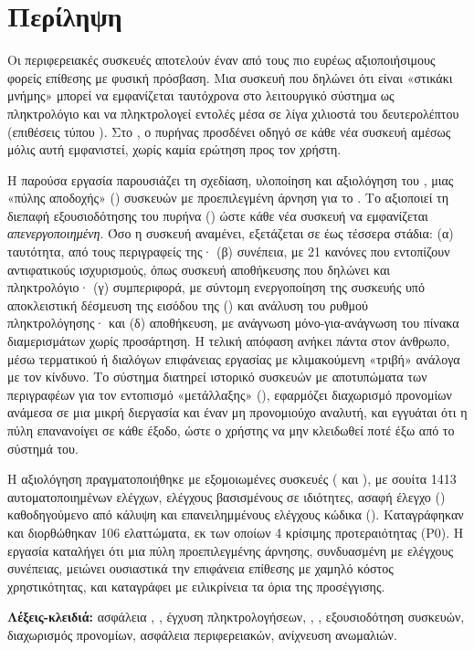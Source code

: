 \chapter*{Περίληψη}
\thispagestyle{plain}

Οι περιφερειακές συσκευές  αποτελούν έναν από τους πιο ευρέως
αξιοποιήσιμους φορείς επίθεσης με φυσική πρόσβαση. Μια συσκευή που δηλώνει ότι
είναι «στικάκι μνήμης» μπορεί να εμφανίζεται ταυτόχρονα στο λειτουργικό σύστημα ως
πληκτρολόγιο και να πληκτρολογεί εντολές μέσα σε λίγα χιλιοστά του δευτερολέπτου
(επιθέσεις τύπου ). Στο , ο πυρήνας προσδένει οδηγό σε κάθε
νέα συσκευή αμέσως μόλις αυτή εμφανιστεί, χωρίς καμία ερώτηση προς τον χρήστη.

Η παρούσα εργασία παρουσιάζει τη σχεδίαση, υλοποίηση και αξιολόγηση του
\Probolos, μιας «πύλης αποδοχής» () συσκευών  με
προεπιλεγμένη άρνηση για το . Το \Probolos{} αξιοποιεί τη διεπαφή
εξουσιοδότησης του πυρήνα () ώστε κάθε νέα συσκευή να
εμφανίζεται \emph{απενεργοποιημένη}. Όσο η συσκευή αναμένει, εξετάζεται σε έως
τέσσερα στάδια: (α) ταυτότητα, από τους περιγραφείς της· (β) συνέπεια, με
21 κανόνες που εντοπίζουν αντιφατικούς ισχυρισμούς, όπως συσκευή αποθήκευσης που
δηλώνει και πληκτρολόγιο· (γ) συμπεριφορά, με σύντομη ενεργοποίηση της συσκευής
υπό αποκλειστική δέσμευση της εισόδου της () και ανάλυση του ρυθμού
πληκτρολόγησης· και (δ) αποθήκευση, με ανάγνωση μόνο-για-ανάγνωση του πίνακα
διαμερισμάτων χωρίς προσάρτηση. Η τελική απόφαση ανήκει πάντα στον άνθρωπο, μέσω
τερματικού ή διαλόγων επιφάνειας εργασίας με κλιμακούμενη «τριβή» ανάλογα με τον
κίνδυνο. Το σύστημα διατηρεί ιστορικό συσκευών με αποτυπώματα των περιγραφέων
για τον εντοπισμό «μετάλλαξης» (), εφαρμόζει διαχωρισμό
προνομίων ανάμεσα σε μια μικρή διεργασία  και έναν μη προνομιούχο
αναλυτή, και εγγυάται ότι η πύλη επανανοίγει σε κάθε έξοδο, ώστε ο χρήστης να μην
κλειδωθεί ποτέ έξω από το σύστημά του.

Η αξιολόγηση πραγματοποιήθηκε με εξομοιωμένες συσκευές 
( και ), με σουίτα 1413 αυτοματοποιημένων ελέγχων,
ελέγχους βασισμένους σε ιδιότητες, ασαφή έλεγχο () καθοδηγούμενο
από κάλυψη και επανειλημμένους ελέγχους κώδικα (). Καταγράφηκαν και
διορθώθηκαν 106 ελαττώματα, εκ των οποίων 4 κρίσιμης προτεραιότητας (P0). Η
εργασία καταλήγει ότι μια πύλη προεπιλεγμένης άρνησης, συνδυασμένη με ελέγχους
συνέπειας, μειώνει ουσιαστικά την επιφάνεια επίθεσης  με χαμηλό
κόστος χρηστικότητας, και καταγράφει με ειλικρίνεια τα όρια της προσέγγισης.

\vspace{0.8cm}
\noindent\textbf{Λέξεις-κλειδιά:} ασφάλεια , , έγχυση
πληκτρολογήσεων, , , εξουσιοδότηση συσκευών, διαχωρισμός
προνομίων, ασφάλεια περιφερειακών, ανίχνευση ανωμαλιών.
